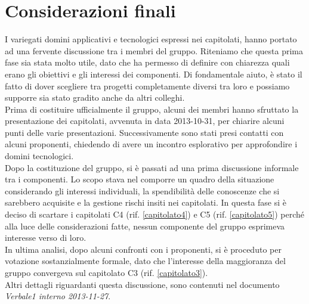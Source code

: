 \section{Considerazioni finali}
\label{considerazioni}
I variegati domini applicativi e tecnologici espressi nei capitolati, hanno portato ad una fervente discussione tra i membri del gruppo. Riteniamo che questa prima fase sia stata molto utile, dato che ha permesso di definire con chiarezza quali erano gli obiettivi e gli interessi dei componenti. Di fondamentale aiuto, è stato il fatto di dover scegliere tra progetti completamente diversi tra loro e possiamo supporre sia stato gradito anche da altri colleghi.
\\Prima di costituire ufficialmente il gruppo, alcuni dei membri hanno sfruttato la presentazione dei capitolati, avvenuta in data 2013-10-31, per chiarire alcuni punti delle varie presentazioni. Successivamente sono stati presi contatti con alcuni proponenti, chiedendo di avere un incontro esplorativo per approfondire i domini tecnologici.
\\Dopo la costituzione del gruppo, si è passati ad una prima discussione informale tra i componenti. Lo scopo stava nel comporre un quadro della situazione considerando gli interessi individuali, la spendibilità delle conoscenze che si sarebbero acquisite e la gestione rischi insiti nei capitolati. In questa fase si è deciso di scartare i capitolati C4 (rif. \ref{capitolato4}) e C5 (rif. \ref{capitolato5}) perché alla luce delle considerazioni fatte, nessun componente del gruppo esprimeva interesse verso di loro.
\\In ultima analisi, dopo alcuni confronti con i proponenti, si è proceduto per votazione sostanzialmente formale, dato che l'interesse della maggioranza del gruppo convergeva sul capitolato C3 (rif. \ref{capitolato3}).
\\Altri dettagli riguardanti questa discussione, sono contenuti nel documento \textit{Verbale1 interno 2013-11-27}. 